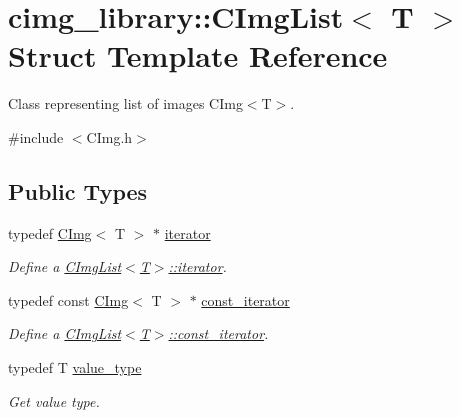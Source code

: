 \hypertarget{structcimg__library_1_1_c_img_list}{
\section{cimg\_\-library::CImgList$<$ T $>$ Struct Template Reference}
\label{structcimg__library_1_1_c_img_list}
}


Class representing list of images CImg$<$T$>$.  




{\ttfamily \#include $<$CImg.h$>$}

\subsection*{Public Types}
\begin{DoxyCompactItemize}
\item 
\hypertarget{structcimg__library_1_1_c_img_list_ac4e7d5d973678ecd8250aa7eff9b9c98}{
typedef \hyperlink{structcimg__library_1_1_c_img}{CImg}$<$ T $>$ $\ast$ \hyperlink{structcimg__library_1_1_c_img_list_ac4e7d5d973678ecd8250aa7eff9b9c98}{iterator}}
\label{structcimg__library_1_1_c_img_list_ac4e7d5d973678ecd8250aa7eff9b9c98}

\begin{DoxyCompactList}\small\item\em Define a \hyperlink{structcimg__library_1_1_c_img_list_ac4e7d5d973678ecd8250aa7eff9b9c98}{CImgList$<$T$>$::iterator}. \item\end{DoxyCompactList}\item 
\hypertarget{structcimg__library_1_1_c_img_list_a9f452dd491a85506dbaca5ea32a636e3}{
typedef const \hyperlink{structcimg__library_1_1_c_img}{CImg}$<$ T $>$ $\ast$ \hyperlink{structcimg__library_1_1_c_img_list_a9f452dd491a85506dbaca5ea32a636e3}{const\_\-iterator}}
\label{structcimg__library_1_1_c_img_list_a9f452dd491a85506dbaca5ea32a636e3}

\begin{DoxyCompactList}\small\item\em Define a \hyperlink{structcimg__library_1_1_c_img_list_a9f452dd491a85506dbaca5ea32a636e3}{CImgList$<$T$>$::const\_\-iterator}. \item\end{DoxyCompactList}\item 
\hypertarget{structcimg__library_1_1_c_img_list_ab3c229d5b1ee47f7c71cb1499b29e4e4}{
typedef T \hyperlink{structcimg__library_1_1_c_img_list_ab3c229d5b1ee47f7c71cb1499b29e4e4}{value\_\-type}}
\label{structcimg__library_1_1_c_img_list_ab3c229d5b1ee47f7c71cb1499b29e4e4}

\begin{DoxyCompactList}\small\item\em Get value type. \item\end{DoxyCompactList}\end{DoxyCompactItemize}
